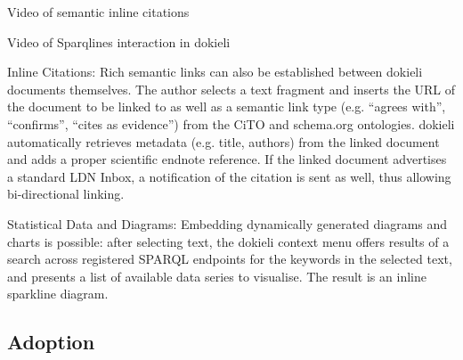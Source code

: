 \documentclass[a4paper]{llncs}
\begin{document}
                                    
                                    
                                        
                                            
                                        
                                        \empty Video of semantic inline citations
                                    

                                    
                                        
                                            
                                        
                                        \empty Video of Sparqlines interaction in dokieli
                                    
                                    

                                    
\par Inline Citations: Rich semantic links can also be established between dokieli documents themselves.
                                    The author selects a text fragment and inserts the URL of the document to be linked to as well as a semantic link type (e.g. “agrees with”, “confirms”, “cites as evidence”) from the CiTO and schema.org ontologies. dokieli automatically retrieves metadata (e.g. title, authors) from the linked document and adds a proper scientific endnote reference. If the linked document advertises a standard LDN Inbox, a notification of the citation is sent as well, thus allowing bi-directional linking.
                                    

                                    
\par Statistical Data and Diagrams: Embedding dynamically generated diagrams and charts is possible: after selecting text, the dokieli context menu offers results of a search across registered SPARQL endpoints for the keywords in the selected text, and presents a list of available data series to visualise. The result is an inline sparkline diagram.
                                
                            

                            
                                \subsection{Adoption}
  \label{adoption}
\end{document}
